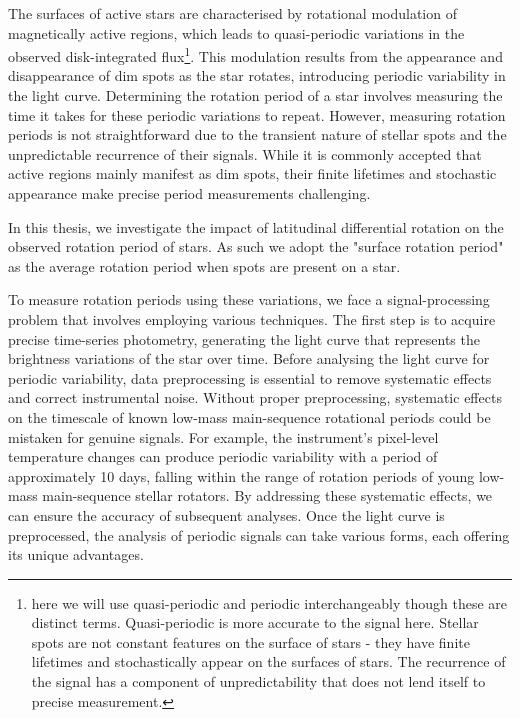 The surfaces of active stars are characterised by rotational modulation of magnetically active regions, which leads to quasi-periodic variations in the observed disk-integrated flux\footnote{here we will use quasi-periodic and periodic interchangeably though these are distinct terms. Quasi-periodic is more accurate to the signal here. Stellar spots are not constant features on the surface of stars - they have finite lifetimes and stochastically appear on the surfaces of stars. The recurrence of the signal has a component of unpredictability that does not lend itself to precise measurement.}. 
This modulation results from the appearance and disappearance of dim spots as the star rotates, introducing periodic variability in the light curve. Determining the rotation period of a star involves measuring the time it takes for these periodic variations to repeat.
However, measuring rotation periods is not straightforward due to the transient nature of stellar spots and the unpredictable recurrence of their signals. While it is commonly accepted that active regions mainly manifest as dim spots, their finite lifetimes and stochastic appearance make precise period measurements challenging.

In this thesis, we investigate the impact of latitudinal differential rotation on the observed rotation period of stars.
As such we adopt the "surface rotation period" as the average rotation period when spots are present on a star.

To measure rotation periods using these variations, we face a signal-processing problem that involves employing various techniques. 
The first step is to acquire precise time-series photometry, generating the light curve that represents the brightness variations of the star over time.
 Before analysing the light curve for periodic variability, data preprocessing is essential to remove systematic effects and correct instrumental noise. 
 Without proper preprocessing, systematic effects on the timescale of known low-mass main-sequence rotational periods could be mistaken for genuine signals.
For example, the \kepler{} instrument's pixel-level temperature changes can produce periodic variability with a period of approximately 10 days, falling within the range of rotation periods of young low-mass main-sequence stellar rotators. 
By addressing these systematic effects, we can ensure the accuracy of subsequent analyses.
Once the light curve is preprocessed, the analysis of periodic signals can take various forms, each offering its unique advantages. 

